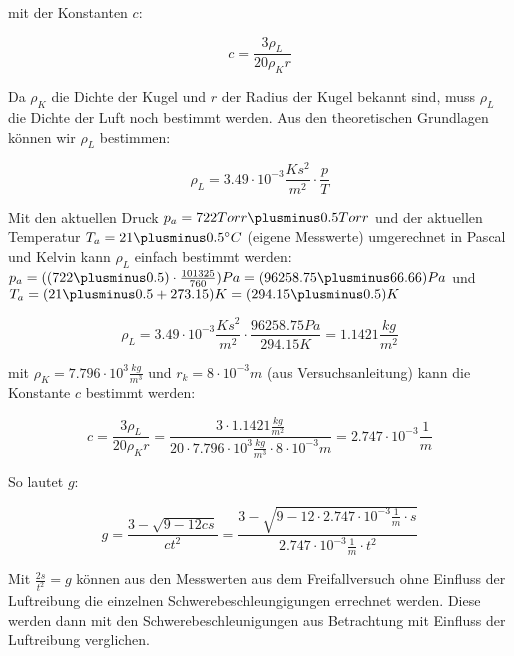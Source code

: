 \documentclass{protokoll}
\begin{document}
mit der Konstanten $c$:


\begin{equation}
c = \frac{3 \rho_L}{20 \rho_K r}
\end{equation}




Da $\rho_K$ die Dichte der Kugel und $r$ der Radius der Kugel bekannt sind,
muss $\rho_L$ die Dichte der Luft noch bestimmt werden. Aus den theoretischen Grundlagen
können wir $\rho_L$ bestimmen:


\begin{equation}
\rho_L = 3.49\cdot 10^{-3} \frac{Ks^2}{m^2}\cdot \frac{p}{T}
\end{equation}




Mit den aktuellen Druck $p_a = 722 Torr \plusminus 0.5 Torr$ und der aktuellen Temperatur
$T_a = 21 \plusminus 0.5 ^\circ C$ (eigene Messwerte) umgerechnet in Pascal und Kelvin kann $\rho_L$
einfach bestimmt werden: $p_a = ((722 \plusminus 0.5)\cdot \frac{101325}{760}) Pa = (96258.75 \plusminus 66.66) Pa$ 
und $T_a = (21 \plusminus 0.5 + 273.15) K = (294.15 \plusminus 0.5) K$


\begin{equation}
 \rho_L = 3.49\cdot 10^{-3} \frac{Ks^2}{m^2}\cdot \frac{96258.75 Pa}{294.15 K} = 1.1421 \frac{kg}{m^2}
\end{equation}




mit $\rho_K = 7.796\cdot 10^3 \frac{kg}{m^3}$ und $ r_k = 8\cdot 10^{-3} m$ (aus Versuchsanleitung)
kann die Konstante $c$ bestimmt werden:


\begin{equation}
c = \frac{3 \rho_L}{20 \rho_K r} = \frac{3\cdot 1.1421 \frac{kg}{m^2}}{20\cdot 7.796\cdot 10^3 \frac{kg}{m^3}\cdot 8\cdot 10^{-3} m}
= 2.747\cdot 10^{-3} \frac{1}{m}
\end{equation}




So lautet $g$:


\begin{equation}
g = \frac{3 - \sqrt{9 - 12cs}}{ct^2} = \frac{3 - \sqrt{9 - 12\cdot 2.747\cdot 10^{-3} \frac{1}{m}\cdot s}}{2.747\cdot 10^{-3} \frac{1}{m}\cdot t^2}
\end{equation}






Mit $ \frac{2s}{t^2} = g $ können aus den Messwerten aus dem Freifallversuch ohne Einfluss der 
Luftreibung die einzelnen Schwerebeschleungigungen errechnet werden.
Diese werden dann mit den Schwerebeschleunigungen aus Betrachtung mit Einfluss der Luftreibung verglichen.
\end{document}
